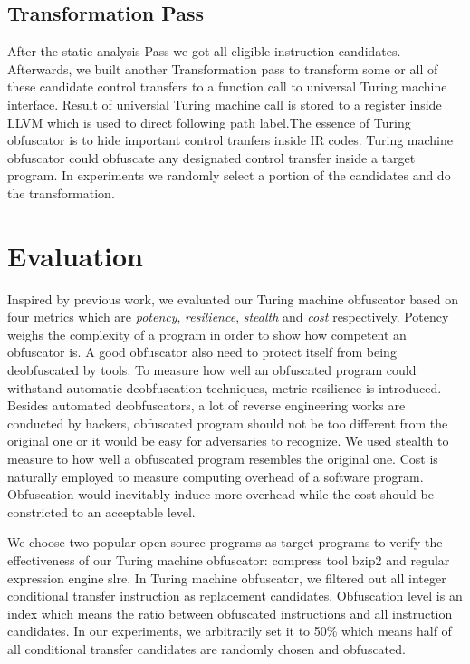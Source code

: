 \documentclass[lnicst]{svmultln}
\begin{document}
\subsection{Transformation Pass}
After the static analysis Pass we got all eligible instruction candidates. Afterwards, we built another Transformation pass to transform some or all of these candidate control transfers to a function call to universal Turing machine interface. Result of universial Turing machine call is stored to a register inside LLVM which is used to direct following path label.The essence of Turing obfuscator is to hide important control tranfers inside IR codes. Turing machine obfuscator could obfuscate any designated control transfer inside a target program. In experiments we randomly select a portion of the candidates and do the transformation.
\section{Evaluation}
Inspired by previous work\cite{Collberg}, we evaluated our Turing machine obfuscator based on four metrics which are \textit{potency}, \textit{resilience}, \textit{stealth} and \textit{cost} respectively. Potency weighs the complexity of a program in order to show how competent an obfuscator is. A good obfuscator also need to protect itself from being deobfuscated by tools. To measure how well an obfuscated program could withstand automatic deobfuscation techniques, metric resilience is introduced. Besides automated deobfuscators, a lot of reverse engineering works are conducted by hackers, obfuscated program should not be too different from the original one or it would be easy for adversaries to recognize. We used stealth to measure to how well a obfuscated program resembles the original one. Cost is naturally employed to measure computing overhead of a software program. Obfuscation would inevitably induce more overhead while the cost should be constricted to an acceptable level.

We choose two popular open source programs as target programs to verify the effectiveness of our Turing machine obfuscator: compress tool bzip2\cite{bzip2} and regular expression engine slre\cite{slre}. In Turing machine obfuscator, we filtered out all integer conditional transfer instruction as replacement candidates. Obfuscation level is an index which means the ratio between obfuscated instructions and all instruction candidates. In our experiments, we arbitrarily set it to 50\% which means half of all conditional transfer candidates are randomly chosen and obfuscated.
\end{document}
